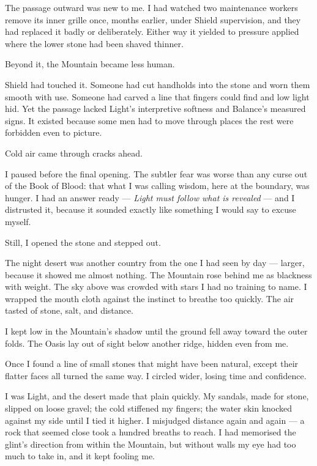 The passage outward was new to me. I had watched two maintenance workers remove its inner grille once, months earlier, under Shield supervision, and they had replaced it badly or deliberately. Either way it yielded to pressure applied where the lower stone had been shaved thinner.\par

Beyond it, the Mountain became less human.\par

Shield had touched it. Someone had cut handholds into the stone and worn them smooth with use. Someone had carved a line that fingers could find and low light hid. Yet the passage lacked Light's interpretive softness and Balance's measured signs. It existed because some men had to move through places the rest were forbidden even to picture.\par

Cold air came through cracks ahead.\par

I paused before the final opening. The subtler fear was worse than any curse out of the Book of Blood: that what I was calling wisdom, here at the boundary, was hunger. I had an answer ready --- \textit{Light must follow what is revealed} --- and I distrusted it, because it sounded exactly like something I would say to excuse myself.\par

Still, I opened the stone and stepped out.\par

The night desert was another country from the one I had seen by day --- larger, because it showed me almost nothing. The Mountain rose behind me as blackness with weight. The sky above was crowded with stars I had no training to name. I wrapped the mouth cloth against the instinct to breathe too quickly. The air tasted of stone, salt, and distance.\par

I kept low in the Mountain's shadow until the ground fell away toward the outer folds. The Oasis lay out of sight below another ridge, hidden even from me.\par

Once I found a line of small stones that might have been natural, except their flatter faces all turned the same way. I circled wider, losing time and confidence.\par

I was Light, and the desert made that plain quickly. My sandals, made for stone, slipped on loose gravel; the cold stiffened my fingers; the water skin knocked against my side until I tied it higher. I misjudged distance again and again --- a rock that seemed close took a hundred breaths to reach. I had memorised the glint's direction from within the Mountain, but without walls my eye had too much to take in, and it kept fooling me.\par

